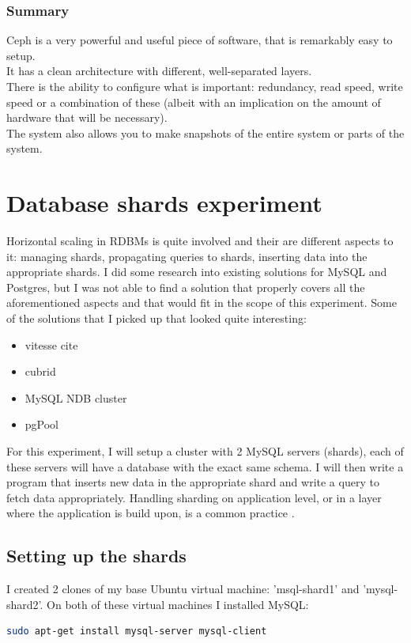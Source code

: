 \documentclass[12pt]{report}
\begin{document}
\subsubsection{Summary}
Ceph is a very powerful and useful piece of software, that is
remarkably easy to setup.\\
It has a clean architecture with different, well-separated layers.\\
There is the ability to configure what is important: redundancy, read
speed, write speed or a combination of these (albeit with an
implication on the amount of hardware that will be necessary).\\
The system also allows you to make snapshots of the entire system or parts
of the system.

\section{Database shards experiment}
Horizontal scaling in RDBMs is quite involved and their are different
aspects to it: managing shards, propagating queries to shards,
inserting data into the appropriate shards.
I did some research into existing solutions for MySQL and Postgres, but
I was not able to find a solution that properly covers all the
aforementioned aspects and that would fit in the scope of this
experiment.
Some of the solutions that I picked up that looked quite interesting:
\begin{itemize}
\item vitesse cite
\item cubrid
\item MySQL NDB cluster
\item pgPool
\end{itemize}

For this experiment, I will setup a cluster with 2 MySQL servers (shards), each
of these servers will have a database with the exact same schema. I will
then write a program that inserts new data in the appropriate shard
and write a query to fetch data appropriately.
Handling sharding on application level, or in a layer where the
application is build upon, is a common practice
\cite{tumblr_sharding}. 

\subsection{Setting up the shards}
I created 2 clones of my base Ubuntu virtual machine: 'msql-shard1'
and 'mysql-shard2'. 
On both of these virtual machines I installed MySQL:
\begin{lstlisting}[language=bash]
sudo apt-get install mysql-server mysql-client
\end{lstlisting}
\end{document}
